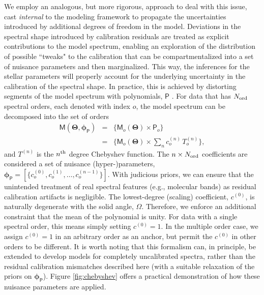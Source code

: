 \documentclass[iop,floatfix]{emulateapj}
\newcommand{\vM}{\mathsf{M}}
\newcommand{\vT}{ {\bm \Theta}}
\newcommand{\vp}{ {\bm \phi}}
\newcommand{\cheb}{ \vp_{\mathsf{P}}}
\begin{document}
We employ an analogous, but more rigorous, approach to deal with this issue, cast {\it internal} to 
the modeling framework to propagate the uncertainties introduced by additional degrees of freedom 
in the model.  Deviations in the spectral shape introduced by calibration residuals are treated as 
explicit contributions to the model spectrum, enabling an exploration of the distribution of 
possible ``tweaks" to the calibration that can be compartmentalized into a set of nuisance 
parameters and then marginalized.  This way, the inferences for the stellar parameters will 
properly account for the underlying uncertainty in the calibration of the spectral shape.  In 
practice, this is achieved by distorting segments of the model spectrum with polynomials, 
$\mathsf{P}$ \citep[e.g.,][]{eisenstein06,koleva09}.  For data that has $N_{\rm ord}$ spectral 
orders, each denoted with index $o$, the model spectrum can be decomposed into the set of orders
\begin{eqnarray} \label{eqn:chebyshev}
\vM(\vT, \cheb) &=& \{ \vM_o(\vT) \times \mathsf{P}_o \} \\
                &=& \{ \vM_o(\vT) \times \sum_n c_o^{(n)} \, T_o^{(n)} \}, \nonumber
\end{eqnarray}
and $T^{(n)}$ is the $n^{\rm th}$ degree Chebyshev function.  The $n \times N_{\rm ord}$ 
coefficients are considered a set of nuisance (hyper-)parameters, $\cheb = [\{c_o^{(0)}, c_o^{(1)}, 
\ldots, c_o^{(n-1)} \}]$.  With judicious priors, we can ensure that the unintended treatment of 
real spectral features (e.g., molecular bands) as residual calibration artifacts is negligible.  
The lowest-degree (scaling) coefficient, $c^{(0)}$, is naturally degenerate with the solid angle, 
$\Omega$.  Therefore, we enforce an additional constraint that the mean of the polynomial is 
unity.  For data with a single spectral order, this means simply setting $c^{(0)} = 1$.  In the 
multiple order case, we assign $c^{(0)} = 1$ in an arbitrary order as an anchor, but permit the 
$c^{(0)}$ in other orders to be different.  It is worth noting that this formalism can, in 
principle, be extended to develop models for completely uncalibrated spectra, rather than the 
residual calibration mismatches described here (with a suitable relaxation of the priors on 
$\cheb$).  Figure \ref{fig:chebyshev} offers a practical demonstration of how these nuisance 
parameters are applied. 
\end{document}

